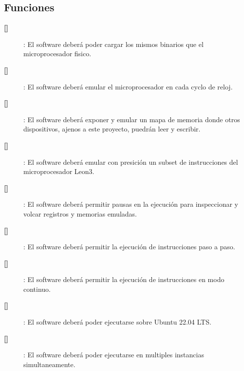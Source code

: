 \documentclass[
  11pt, %
  codirector, %
]{charter}
\makeatletter
\newcommand{\mytwodigits}[1]{\two@digits{#1}}
\newcounter{reqCounter}
\makeatother
\begin{document}
\subsection{Funciones}
\label{sec:org307bb59}

\begin{description}

\item[\textbf{[\CODrequerimiento\mytwodigits{\value{reqCounter}}]}]: El software deberá poder cargar los mismos binarios que el microprocesador fisico.

\item[\textbf{[\CODrequerimiento\mytwodigits{\value{reqCounter}}]}]: El software deberá emular el microprocesador en cada cyclo de reloj.

\item[\textbf{[\CODrequerimiento\mytwodigits{\value{reqCounter}}]}]: El software deberá exponer y emular un mapa de memoria donde otros dispositivos, ajenos a este proyecto, puedrán leer y escribir.

\item[\textbf{[\CODrequerimiento\mytwodigits{\value{reqCounter}}]}]: El software deberá emular con presición un subset de instrucciones del microprocesador Leon3.

\item[\textbf{[\CODrequerimiento\mytwodigits{\value{reqCounter}}]}]: El software deberá permitir pausas en la ejecución para inspeccionar y volcar registros y memorias emuladas.

\item[\textbf{[\CODrequerimiento\mytwodigits{\value{reqCounter}}]}]: El software deberá permitir la ejecución de instrucciones paso a paso.

\item[\textbf{[\CODrequerimiento\mytwodigits{\value{reqCounter}}]}]: El software deberá permitir la ejecución de instrucciones en modo continuo.

\item[\textbf{[\CODrequerimiento\mytwodigits{\value{reqCounter}}]}]: El software deberá poder ejecutarse sobre Ubuntu 22.04 LTS.


\item[\textbf{[\CODrequerimiento\mytwodigits{\value{reqCounter}}]}]: El software deberá poder ejecutarse en multiples instancias simultaneamente.

\end{description}
\end{document}
